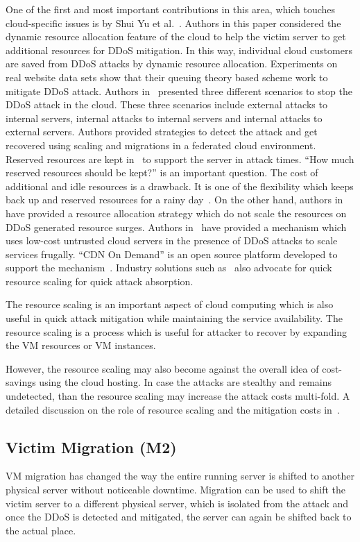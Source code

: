 \documentclass[final,5p,times,twocolumn]{elsarticle}
\begin{document}
One of the first and most important contributions in this area, which touches cloud-specific issues is by Shui Yu et al.~\cite{canwebeat}. Authors in this paper considered the dynamic resource allocation feature of the cloud to help the victim server to get additional resources for DDoS mitigation. In this way, individual cloud customers are saved from DDoS attacks by dynamic resource allocation. Experiments on real website data sets show that their queuing theory based scheme work to mitigate DDoS attack. Authors in~\cite{latanicki} presented three different scenarios to stop the DDoS attack in the cloud. These three scenarios include external attacks to internal servers, internal attacks to internal servers and internal attacks to external servers. Authors provided strategies to detect the attack and get recovered using scaling and migrations in a federated cloud environment. Reserved resources are kept in~\cite{canwebeat} to support the server in attack times. ``How much reserved resources should be kept?'' is an important question. The cost of additional and idle resources is a drawback. It is one of the flexibility which keeps back up and reserved resources for a rainy day~\cite{latanicki}. On the other hand, authors in~\cite{DARAC} have provided a resource allocation strategy which do not scale the resources on DDoS generated resource surges. 
\newpage
\noindent Authors in~\cite{CDNonDemand} have provided a mechanism which uses low-cost untrusted cloud servers in the presence of DDoS attacks to scale services frugally. ``CDN On Demand'' is an open source platform developed to support the mechanism~\cite{CDNonDemand}. {Industry solutions such as~\cite{awsddosprotection} also advocate for quick resource scaling for quick attack absorption. }

{The resource scaling is an important aspect of cloud computing which is also useful in quick attack mitigation while maintaining the service availability. The resource scaling is a process which is useful for attacker to recover by expanding the VM resources or VM instances. }

{However, the resource scaling may also become against the overall idea of cost-savings using the cloud hosting. In case the attacks are stealthy and remains undetected, than the resource scaling may increase the attack costs multi-fold. A detailed discussion on the role of resource scaling and the mitigation costs in~\cite{IEEECC}. }


\subsection{Victim Migration (M2)}
{VM migration has changed the way the entire running server is shifted to another physical server without noticeable downtime. Migration can be used to shift the victim server to a different physical server, which is isolated from the attack and once the DDoS is detected and mitigated, the server can again be shifted back to the actual place. }
\end{document}
